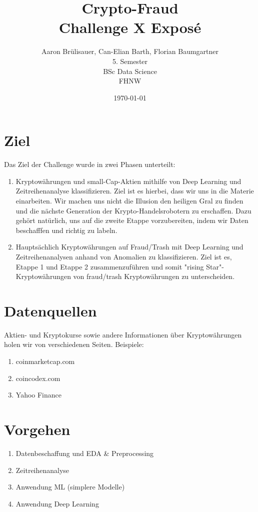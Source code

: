 \documentclass[a4paper,10pt]{article}
\title{Crypto-Fraud\\Challenge X Exposé}
\author{Aaron Brülisauer, Can-Elian Barth, Florian Baumgartner\\ 5. Semester \\ BSc Data Science \\ FHNW}
\date{\today}
\begin{document}
\maketitle

\tableofcontents

\section{Ziel}

Das Ziel der Challenge wurde in zwei Phasen unterteilt:

\begin{enumerate}
   \item Kryptowährungen und small-Cap-Aktien mithilfe von Deep Learning und Zeitreihenanalyse klassifizieren. Ziel ist es hierbei, dass wir uns in die Materie einarbeiten. Wir machen uns nicht die Illusion den heiligen Gral zu finden und die nächste Generation der Krypto-Handelsrobotern zu erschaffen. Dazu gehört natürlich, uns auf die zweite Etappe vorzubereiten, indem wir Daten beschafffen und richtig zu labeln.
   \item Hauptsächlich Kryptowährungen auf Fraud/Trash mit Deep Learning und Zeitreihenanalysen anhand von Anomalien zu klassifizieren. Ziel ist es, Etappe 1 und Etappe 2 zusammenzuführen und somit "rising Star"-Kryptowährungen von fraud/trash Kryptowährungen zu unterscheiden.
\end{enumerate}


\section{Datenquellen}

Aktien- und Kryptokurse sowie andere Informationen über Kryptowährungen holen wir von verschiedenen Seiten. Beispiele:

\begin{enumerate}
    \item coinmarketcap.com
    \item coincodex.com
    \item Yahoo Finance
\end{enumerate}

\section{Vorgehen}

\begin{enumerate}
    \item Datenbeschaffung und EDA \& Preprocessing 
    \item Zeitreihenanalyse
    \item Anwendung ML (simplere Modelle)
    \item Anwendung Deep Learning
\end{enumerate}
\end{document}
